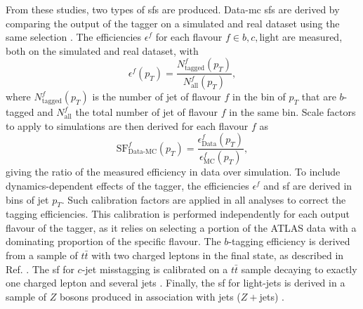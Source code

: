 From these studies, two types of \glspl{sf} are produced. Data-\gls{mc} \glspl{sf} are derived by comparing the output of the tagger on a simulated and real dataset using the same selection \cite{Aad:2019aic, ATLAS-CONF-2018-045, ATLAS-CONF-2018-006, cjettaggingCalib}. The efficiencies $\epsilon^f$ for each flavour $f \in {b, c, \textrm{light}}$ are measured, both on the simulated and real dataset, with \[\epsilon^f(p_T) = \frac{N^f_{\textrm{tagged}}(p_T)}{N^f_{\textrm{all}}(p_T)},\] where $N^f_{\textrm{tagged}}(p_T)$ is the number of jet of flavour $f$ in the bin of $p_T$ that are $b$-tagged and $N^f_{\textrm{all}}$ the total number of jet of flavour $f$ in the same bin. Scale factors to apply to simulations are then derived for each flavour $f$ as \[\textrm{SF}^f_{\textrm{Data-MC}}(p_T) = \frac{\epsilon^f_{\textrm{Data}}(p_T)}{\epsilon^f_{\textrm{MC}}(p_T)},\] giving the ratio of the measured efficiency in data over simulation. To include dynamics-dependent effects of the tagger, the efficiencies $\epsilon^f$ and \gls{sf} are derived in bins of jet $p_T$. Such calibration factors are applied in all analyses to correct the tagging efficiencies. This calibration is performed independently for each output flavour of the tagger, as it relies on selecting a portion of the ATLAS data with a dominating proportion of the specific flavour. The $b$-tagging efficiency is derived from a sample of $t\bar{t}$ with two charged leptons in the final state, as described in Ref. \cite{Aad:2019aic}. The \gls{sf} for $c$-jet misstagging is calibrated on a $t\bar{t}$ sample decaying to exactly one charged lepton and several jets \cite{cjettaggingCalib}. Finally, the \gls{sf} for light-jets is derived in a sample of $Z$ bosons produced in association with jets ($Z+$jets) \cite{ATLAS:2023lwk}. %

